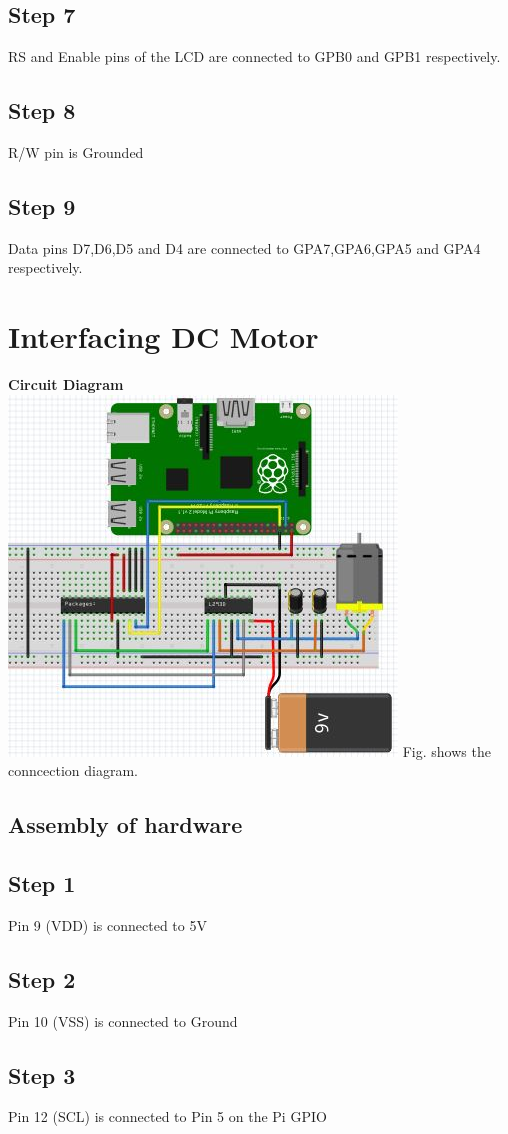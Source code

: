 \documentclass[a4paper,12pt,oneside]{book}
\begin{document}
\subsection*{Step 7}
RS and Enable pins of the LCD are connected to GPB0 and GPB1 respectively.
\subsection*{Step 8}
R/W pin is Grounded
\subsection*{Step 9}
Data pins D7,D6,D5 and D4 are connected to GPA7,GPA6,GPA5 and GPA4 respectively.
\section*{Interfacing DC Motor}
\textbf{Circuit Diagram}\\
\centering
\includegraphics[scale=0.6]{dc_motor_I2C}
\flushleft
Fig. shows the conncection diagram.
\subsection*{Assembly of hardware}
\subsection*{Step 1}
Pin 9 (VDD) is connected to 5V
\subsection*{Step 2}
Pin 10 (VSS) is connected to Ground
\subsection*{Step 3}
Pin 12 (SCL) is connected to Pin 5 on the Pi GPIO
\end{document}
